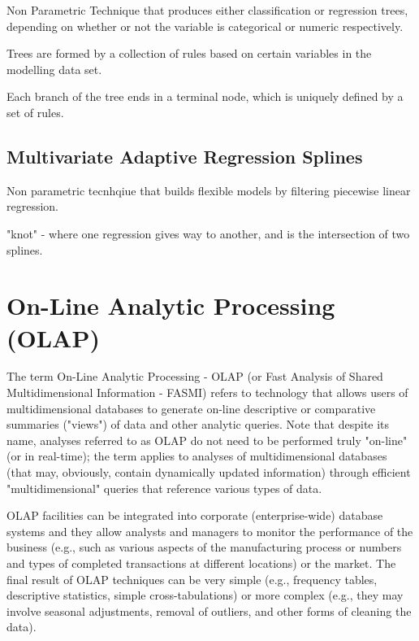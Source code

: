 \documentclass[11pt]{article} %
\begin{document}
Non Parametric Technique that produces either classification or regression trees, depending on whether or not the variable is categorical or numeric respectively.

Trees are formed by a collection of rules based on certain variables in the modelling data set.

Each branch of the tree ends in a terminal node, which is uniquely defined by a set of rules.



\subsection*{Multivariate Adaptive Regression Splines}

Non parametric tecnhqiue that builds flexible models by filtering piecewise linear regression.

"knot" - where one regression gives way to another, and is the intersection of two splines.






\section{On-Line Analytic Processing (OLAP)}


The term On-Line Analytic Processing - OLAP (or Fast Analysis of Shared Multidimensional Information - FASMI) refers to technology that allows users of multidimensional databases to generate on-line descriptive or comparative summaries ("views") of data and other analytic queries. Note that despite its name, analyses referred to as OLAP do not need to be performed truly "on-line" (or in real-time); the term applies to analyses of multidimensional databases (that may, obviously, contain dynamically updated information) through efficient "multidimensional" queries that reference various types of data. 


OLAP facilities can be integrated into corporate (enterprise-wide) database systems and they allow analysts and managers to monitor the performance of the business (e.g., such as various aspects of the manufacturing process or numbers and types of completed transactions at different locations) or the market. The final result of OLAP techniques can be very simple (e.g., frequency tables, descriptive statistics, simple cross-tabulations) or more complex (e.g., they may involve seasonal adjustments, removal of outliers, and other forms of cleaning the data). 
\end{document}
